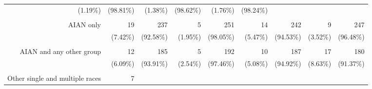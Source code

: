 \documentclass{article}
\begin{document}
\begin{table}[!h]
{\begin{tabular}{lllllllll}
			\multicolumn{1}{r}{(1.19\%)} &
			\multicolumn{1}{r}{(98.81\%)} &
			\multicolumn{1}{r}{(1.38\%)} &
			\multicolumn{1}{r}{(98.62\%)} &
			\multicolumn{1}{r}{(1.76\%)} &
			\multicolumn{1}{r}{(98.24\%)} \\
			\multicolumn{1}{r}{} &
			\multicolumn{1}{|r}{} &
			\multicolumn{1}{r}{} &
			\multicolumn{1}{r}{} &
			\multicolumn{1}{r}{} &
			\multicolumn{1}{r}{} &
			\multicolumn{1}{r}{} &
			\multicolumn{1}{r}{} &
			\multicolumn{1}{r}{} \\
			\multicolumn{1}{r}{AIAN only\hspace{1em}} &
			\multicolumn{1}{|r}{19} &
			\multicolumn{1}{r}{237} &
			\multicolumn{1}{r}{5} &
			\multicolumn{1}{r}{251} &
			\multicolumn{1}{r}{14} &
			\multicolumn{1}{r}{242} &
			\multicolumn{1}{r}{9} &
			\multicolumn{1}{r}{247} \\
			\multicolumn{1}{r}{} &
			\multicolumn{1}{|r}{(7.42\%)} &
			\multicolumn{1}{r}{(92.58\%)} &
			\multicolumn{1}{r}{(1.95\%)} &
			\multicolumn{1}{r}{(98.05\%)} &
			\multicolumn{1}{r}{(5.47\%)} &
			\multicolumn{1}{r}{(94.53\%)} &
			\multicolumn{1}{r}{(3.52\%)} &
			\multicolumn{1}{r}{(96.48\%)} \\
			\multicolumn{1}{r}{} &
			\multicolumn{1}{|r}{} &
			\multicolumn{1}{r}{} &
			\multicolumn{1}{r}{} &
			\multicolumn{1}{r}{} &
			\multicolumn{1}{r}{} &
			\multicolumn{1}{r}{} &
			\multicolumn{1}{r}{} &
			\multicolumn{1}{r}{} \\
			\multicolumn{1}{r}{AIAN and any other group\hspace{1em}} &
			\multicolumn{1}{|r}{12} &
			\multicolumn{1}{r}{185} &
			\multicolumn{1}{r}{5} &
			\multicolumn{1}{r}{192} &
			\multicolumn{1}{r}{10} &
			\multicolumn{1}{r}{187} &
			\multicolumn{1}{r}{17} &
			\multicolumn{1}{r}{180} \\
			\multicolumn{1}{r}{} &
			\multicolumn{1}{|r}{(6.09\%)} &
			\multicolumn{1}{r}{(93.91\%)} &
			\multicolumn{1}{r}{(2.54\%)} &
			\multicolumn{1}{r}{(97.46\%)} &
			\multicolumn{1}{r}{(5.08\%)} &
			\multicolumn{1}{r}{(94.92\%)} &
			\multicolumn{1}{r}{(8.63\%)} &
			\multicolumn{1}{r}{(91.37\%)} \\
			\multicolumn{1}{r}{} &
			\multicolumn{1}{|r}{} &
			\multicolumn{1}{r}{} &
			\multicolumn{1}{r}{} &
			\multicolumn{1}{r}{} &
			\multicolumn{1}{r}{} &
			\multicolumn{1}{r}{} &
			\multicolumn{1}{r}{} &
			\multicolumn{1}{r}{} \\
			\multicolumn{1}{r}{Other single and multiple races\hspace{1em}} &
			\multicolumn{1}{|r}{7} &

\end{tabular}}
\end{table}
\end{document}
